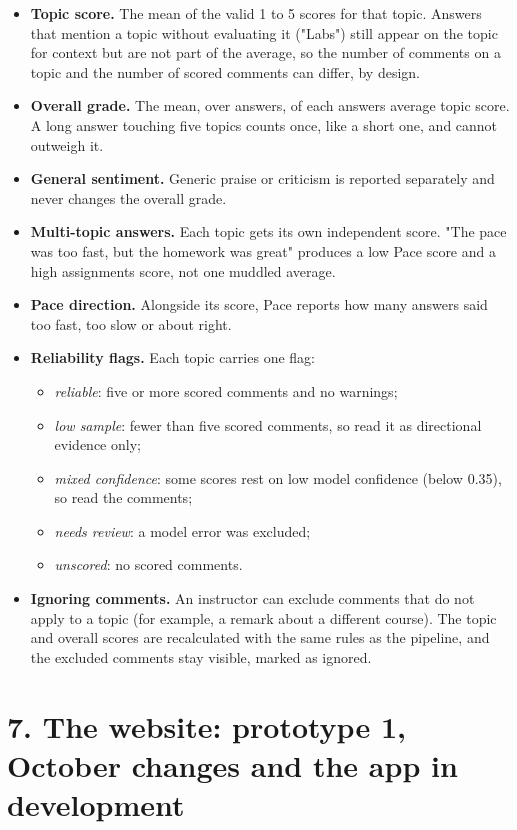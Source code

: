 \documentclass[
  11pt,
]{article}
\providecommand{\tightlist}{%
  \setlength{\itemsep}{0pt}\setlength{\parskip}{0pt}}
\begin{document}
\begin{itemize}
\tightlist
\item
  \textbf{Topic score.} The mean of the valid 1 to 5 scores for that topic.
  Answers that mention a topic without evaluating it ("Labs") still appear on
  the topic for context but are not part of the average, so the number of
  comments on a topic and the number of scored comments can differ, by design.
\item
  \textbf{Overall grade.} The mean, over answers, of each
  answer\textquotesingle s average topic score. A long answer touching five
  topics counts once, like a short one, and cannot outweigh it.
\item
  \textbf{General sentiment.} Generic praise or criticism is reported separately
  and never changes the overall grade.
\item
  \textbf{Multi-topic answers.} Each topic gets its own independent score. "The
  pace was too fast, but the homework was great" produces a low Pace score and a
  high assignments score, not one muddled average.
\item
  \textbf{Pace direction.} Alongside its score, Pace reports how many answers
  said too fast, too slow or about right.
\item
  \textbf{Reliability flags.} Each topic carries one flag:

  \begin{itemize}
  \tightlist
  \item
    \emph{reliable}: five or more scored comments and no warnings;
  \item
    \emph{low sample}: fewer than five scored comments, so read it as
    directional evidence only;
  \item
    \emph{mixed confidence}: some scores rest on low model confidence (below
    0.35), so read the comments;
  \item
    \emph{needs review}: a model error was excluded;
  \item
    \emph{unscored}: no scored comments.
  \end{itemize}
\item
  \textbf{Ignoring comments.} An instructor can exclude comments that do not
  apply to a topic (for example, a remark about a different course). The topic
  and overall scores are recalculated with the same rules as the pipeline, and
  the excluded comments stay visible, marked as ignored.
\end{itemize}

\section{7. The website: prototype 1, October changes and the app in
development}\label{7-the-website-prototype-1-october-changes-and-the-app-in-development}
\end{document}
